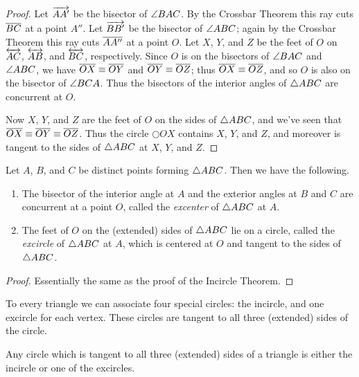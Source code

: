\begin{proof}
Let \(\overrightarrow{AA'}\) be the bisector of \(\angle{BAC}\). By the Crossbar Theorem this ray cuts \(\overline{BC}\) at a point \(A''\). Let \(\overrightarrow{BB'}\) be the bisector of \(\angle{ABC}\); again by the Crossbar Theorem this ray cuts \(\overline{AA''}\) at a point \(O\). Let \(X\), \(Y\), and \(Z\) be the feet of \(O\) on \(\overleftrightarrow{AC}\), \(\overleftrightarrow{AB}\), and \(\overleftrightarrow{BC}\), respectively. Since \(O\) is on the bisectors of \(\angle{BAC}\) and \(\angle{ABC}\), we have \(\overline{OX} \equiv \overline{OY}\) and \(\overline{OY} \equiv \overline{OZ}\); thus \(\overline{OX} \equiv \overline{OZ}\), and so \(O\) is also on the bisector of \(\angle{BCA}\). Thus the bisectors of the interior angles of \(\bigtriangleup{ABC}\) are concurrent at \(O\).

Now \(X\), \(Y\), and \(Z\) are the feet of \(O\) on the sides of \(\bigtriangleup{ABC}\), and we've seen that \(\overline{OX} \equiv \overline{OY} \equiv \overline{OZ}\). Thus the circle \(\Circle{O}{X}\) contains \(X\), \(Y\), and \(Z\), and moreover is tangent to the sides of \(\bigtriangleup{ABC}\) at \(X\), \(Y\), and \(Z\).
\end{proof}

\begin{construct}
Let \(A\), \(B\), and \(C\) be distinct points forming \(\bigtriangleup{ABC}\). Then we have the following.
\begin{enumerate}
\item The bisector of the interior angle at \(A\) and the exterior angles at \(B\) and \(C\) are concurrent at a point \(O\), called the \emph{excenter} of \(\bigtriangleup{ABC}\) at \(A\).

\item The feet of \(O\) on the (extended) sides of \(\bigtriangleup{ABC}\) lie on a circle, called the \emph{excircle} of \(\bigtriangleup{ABC}\) at \(A\), which is centered at \(O\) and tangent to the sides of \(\bigtriangleup{ABC}\).
\end{enumerate}
\end{construct}

\begin{proof}
Essentially the same as the proof of the Incircle Theorem.
\end{proof}

To every triangle we can associate four special circles: the incircle, and one excircle for each vertex. These circles are tangent to all three (extended) sides of the circle.

\begin{prop}
Any circle which is tangent to all three (extended) sides of a triangle is either the incircle or one of the excircles.
\end{prop}
